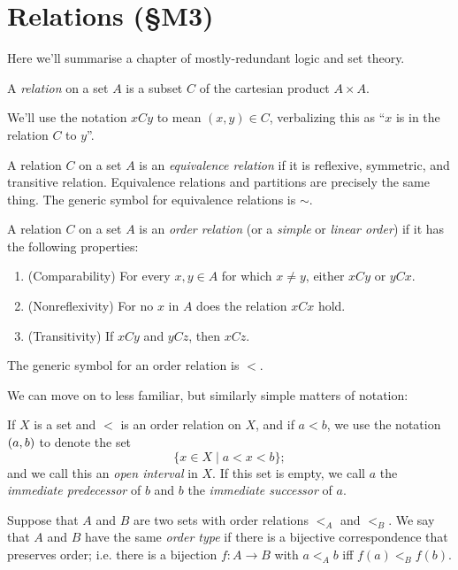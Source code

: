 \documentclass{report}
\begin{document}
\section{Relations (\S M3) }
Here we'll summarise a chapter of mostly-redundant logic and set theory.
\begin{definition}
  A \emph{relation} on a set $A$ is a subset $C$ of the cartesian product $A \times A$.
\end{definition}
We'll use the notation $xCy$ to mean $(x,y) \in C$, verbalizing this  as ``$x$ is in the relation $C$ to $y$''.
\begin{definition}
  A relation $C$ on a set $A$  is an \emph{equivalence relation} if it is reflexive, symmetric, and transitive relation.
  Equivalence relations and partitions are precisely the same thing.
  The generic symbol for equivalence relations is $\sim$.
\end{definition}
\begin{definition}
  A relation $C$ on a set $A$ is an \emph{order relation} (or a \emph{simple} or \emph{linear order}) if it has the following properties:
  \begin{enumerate}[label={(\arabic*)}]
    \item (Comparability) For every $x,y \in A$ for which $x \neq y$, either $xCy$ or $yCx$.
    \item (Nonreflexivity) For no $x$ in $A$ does the relation $xCx$ hold.
    \item (Transitivity) If $xCy$ and $yCz$, then $xCz$.
  \end{enumerate}
  The generic symbol for an order relation is $<$.
\end{definition}

We can move on to less familiar, but similarly simple matters of notation:
\begin{definition}
  If $X$ is a set and $<$ is an order relation on $X$, and if $a < b$, we use the notation $\left( a,b \right)$ to denote the set 
  \[
    \{ x \in X \mid a < x < b \};
  \]
  and we call this an \emph{open interval} in $X$. 
  If this set is empty, we call $a$ the \emph{immediate predecessor} of $b$ and $b$ the \emph{immediate successor} of $a$.
\end{definition}

\begin{definition}
  Suppose that $A$ and $B$ are two sets with order relations $<_A$ and $<_B$.
  We say that $A$ and $B$ have the same \emph{order type} if there is a bijective correspondence that preserves order;
  i.e. there is a bijection $f:A \rightarrow B$ with $a <_A b$ iff $f(a) <_B f(b)$.
\end{definition}
\end{document}
